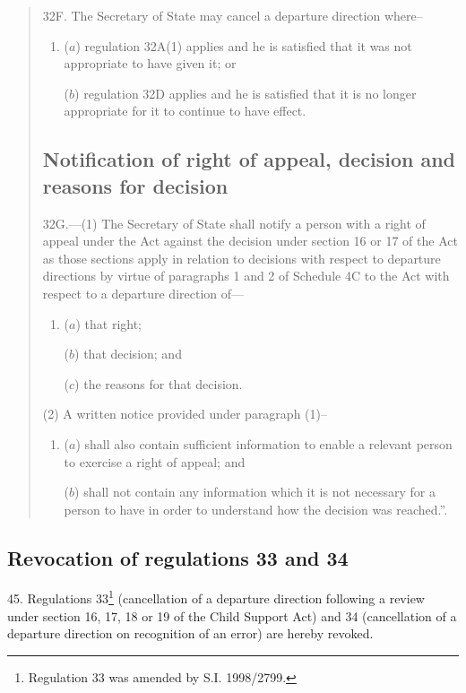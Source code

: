 \documentclass[12pt,a4paper]{article}
\begin{document}
\begin{quotation}
32F.  The Secretary of State may cancel a departure direction where–
\begin{enumerate}\item[]
($a$) regulation 32A(1) applies and he is satisfied that it was not appropriate to have given it; or

($b$) regulation 32D applies and he is satisfied that it is no longer appropriate for it to continue to have effect.
\end{enumerate}

\subsection*{Notification of right of appeal, decision and reasons for decision}

32G.—(1) The Secretary of State shall notify a person with a right of appeal under the Act against the decision under section 16 or 17 of the Act as those sections apply in relation to decisions with respect to departure directions by virtue of paragraphs 1 and 2 of Schedule 4C to the Act with respect to a departure direction of---
\begin{enumerate}\item[]
($a$) that right;

($b$) that decision; and

($c$) the reasons for that decision.
\end{enumerate}

(2) A written notice provided under paragraph (1)–
\begin{enumerate}\item[]
($a$) shall also contain sufficient information to enable a relevant person to exercise a right of appeal; and

($b$) shall not contain any information which it is not necessary for a person to have in order to understand how the decision was reached.”.
\end{enumerate}
\end{quotation}

\subsection[45. Revocation of regulations 33 and 34]{Revocation of regulations 33 and 34}

45.  Regulations 33\footnote{\frenchspacing Regulation 33 was amended by S.I. 1998/2799.} (cancellation of a departure direction following a review under section 16, 17, 18 or 19 of the Child Support Act) and 34 (cancellation of a departure direction on recognition of an error) are hereby revoked.
\end{document}
